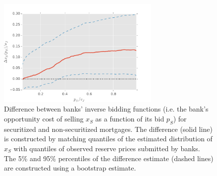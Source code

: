\documentclass[11pt,twopage]{article}
\begin{document}
\begin{figure}[htp]
	\begin{center}
		\includegraphics[width=0.7\textwidth]{graphics/xs-diff-10-line}
		\caption{Difference between banks' inverse bidding functions (i.e. the bank's opportunity cost of selling $x_S$ as a function of its bid $p_S$) for securitized and non-securitized mortgages. The difference (solid line) is constructed by matching quantiles of the estimated distribution of $x_S$ with quantiles of observed reserve prices submitted by banks. The 5\% and 95\% percentiles of the difference estimate (dashed lines) are constructed using a bootstrap estimate.\label{fig:xs-diff-10}}
	\end{center}
\end{figure}
\end{document}
